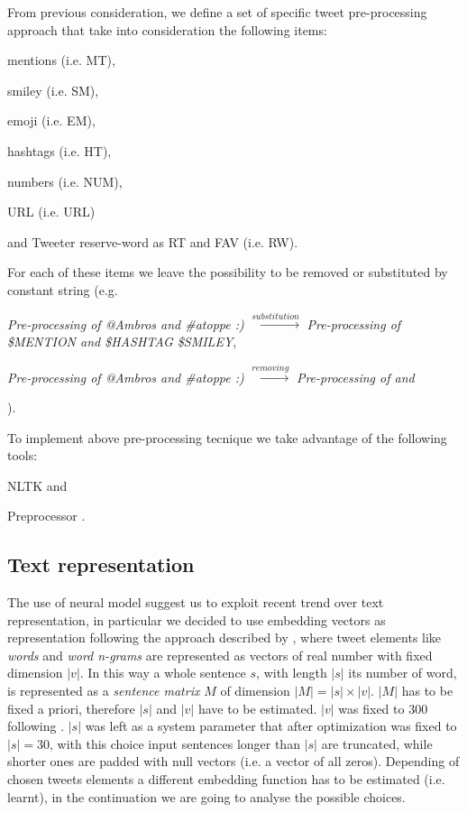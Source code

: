 From previous consideration, we define a set of specific tweet pre-processing approach that take into consideration the following items:
\begin{enumerate*}
\item mentions (i.e. MT),
\item smiley (i.e. SM),
\item emoji (i.e. EM),
\item hashtags (i.e. HT),
\item numbers (i.e. NUM),
\item URL (i.e. URL)
\item and Tweeter reserve-word as RT and FAV (i.e. RW).
\end{enumerate*}

For each of these items we leave the possibility to be removed or substituted by constant string (e.g.
\begin{enumerate*}
\item \emph{Pre-processing of @Ambros and \#atoppe :)} $\xrightarrow{substitution} $ \emph{Pre-processing of \$MENTION and \$HASHTAG \$SMILEY},
\item \emph{Pre-processing of @Ambros and \#atoppe :)} $\xrightarrow{removing} $ \emph{Pre-processing of and}
\end{enumerate*}
).

To implement above pre-processing tecnique we take advantage of the following tools:
\begin{enumerate*}
\item NLTK \cite{nltk} and 
\item Preprocessor \cite{tweets-preprocessor}.
\end{enumerate*}



\subsection{Text representation} \label{subsec:representation}
The use of neural model suggest us to exploit recent trend over text representation, in particular we decided to use embedding vectors as representation following the approach described by \cite{bojanowski2016enriching}, where tweet elements like \emph{words} and \emph{word n-grams} are represented as vectors of real number with fixed dimension $|v|$.
In this way a whole sentence $s$, with length $|s|$ its number of word, is represented as a \emph{sentence matrix} $M$ of dimension $|M| = |s| \times |v|$. $|M|$ has to be fixed a priori, therefore $|s|$ and $|v|$ have to be estimated. $|v|$ was fixed to 300 following \cite{bojanowski2016enriching}. $|s|$ was left as a system parameter that after optimization was fixed to $|s| = 30$, with this choice 
input sentences longer than $|s|$ are truncated, while shorter ones are padded with null vectors (i.e. a vector of all zeros).
Depending of chosen tweets elements a different embedding function has to be estimated (i.e. learnt), in the continuation we are going to analyse the possible choices.


